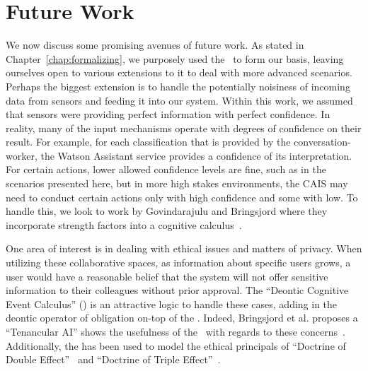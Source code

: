 \section{Future Work}

We now discuss some promising avenues of future work. As stated in
Chapter~\ref{chap:formalizing}, we purposely used the \CEC\ to form our
basis, leaving ourselves open to various extensions to it to deal with
more advanced scenarios. Perhaps the biggest extension is to handle the
potentially noisiness of incoming data from sensors and feeding it into
our system. Within this work, we assumed that sensors were providing
perfect information with perfect confidence. In reality, many of the input
mechanisms operate with degrees of confidence on their result. For example,
for each classification that is provided by the conversation-worker, the
Watson Assistant service provides a confidence of its interpretation. For
certain actions, lower allowed confidence levels are fine, such as in the
scenarios presented here, but in more high stakes environments,
the CAIS may need to conduct certain actions only with high confidence and
some with low. To handle this, we look to work by Govindarajulu and Bringsjord
where they incorporate strength factors into a cognitive
calculus~\cite{govindarajulu_strength_2017}.


One area of interest is in dealing with ethical
issues and matters of privacy. When utilizing these collaborative spaces,
as information about specific users grows, a user would have a reasonable
belief that the system will not offer sensitive information to their
colleagues without prior approval. The ``Deontic Cognitive Event
Calculus'' (\DCEC) is an attractive logic to handle these cases, adding in the
deontic operator of obligation on-top of the \CEC. Indeed, Bringsjord et al.
proposes a ``Tenancular AI'' shows the usefulness of the \DCEC\ with regards
to these concerns~\cite{bringsjord_tentacular_2018}. Additionally, the \DCEC
has been used to model the ethical principals of ``Doctrine of Double
Effect''~\cite{govindarajulu_automating_2017} and ``Doctrine of Triple
Effect''~\cite{peveler_towards_2018}.

